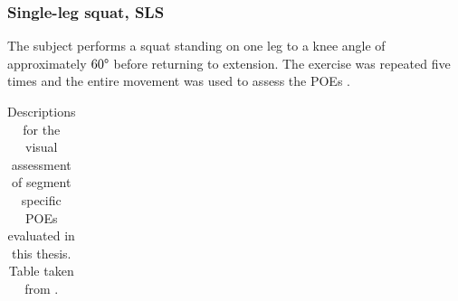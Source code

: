 \subsubsection{Single-leg squat, SLS} \label{sec:SLS}
The subject performs a squat standing on one leg to a knee angle of approximately $60\degree$ before returning to extension. The exercise was repeated five times and the entire movement was used to assess the POEs \cite{Nae2020}. %

\begin{table}
 \centering
 \caption{Descriptions for the visual assessment of segment specific POEs evaluated in this thesis. Table taken from \cite{Nae2020}.}
 \label{tab:poes}
 \footnotesize
 {\tabulinesep=0.8mm
 \begin{tabu}[t]{c|ccc}


\end{tabu}}
\end{table}
